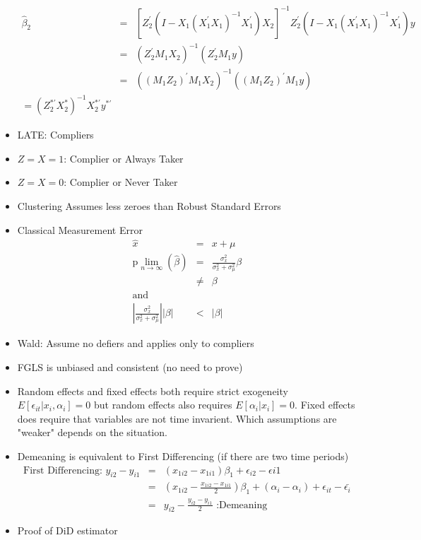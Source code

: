 \documentclass[11pt]{SelfArxOneColBMN}
\begin{document}
\begin{itemize}
\begin{eqnarray*}
    \hat{\beta}_2 &=& [Z_2^\prime(I - X_1(X_1^\prime X_1)^{-1}X_1^\prime)X_2]^{-1}Z^\prime_2(I - X_1(X_1^\prime X_1)^{-1}X_1^\prime)y\\
    &=& (Z_2^\prime M_1X_2)^{-1}(Z_2^\prime M_1y)\\
    &=& ((M_1Z_2)^\prime M_1X_2)^{-1}((M_1Z_2)^\prime M_1y)\\
    = (Z_2^{*\prime}X_2^*)^{-1}X_2^{*\prime}y^{*\prime}
  \end{eqnarray*}
  \item LATE: Compliers
  \item $Z = X = 1$: Complier or Always Taker
  \item $Z = X = 0$: Complier or Never Taker
  \item Clustering Assumes less zeroes than Robust Standard Errors
  \item Classical Measurement Error
  \begin{eqnarray*}
    \hat{x} &=& x + \mu\\
    \text{p}\lim_{n\rightarrow\infty}(\hat{\beta}) &=& \frac{\sigma_x^2}{\sigma_x^2 + \sigma^2_\mu}\beta\\
    &\neq& \beta\\
    \text{and}\\
    |\frac{\sigma_x^2}{\sigma_x^2 + \sigma^2_\mu}||\beta| &<& |\beta|
  \end{eqnarray*}
  \item Wald: Assume no defiers and applies only to compliers
  \item FGLS is unbiased and consistent (no need to prove)
  \item Random effects and fixed effects both require strict exogeneity $E[\epsilon_{it}|x_i,\alpha_i] = 0$ but random effects also requires $E[\alpha_i|x_i] = 0$. Fixed effects does require that variables are not time invarient. Which assumptions are "weaker" depends on the situation.
  \item Demeaning is equivalent to First Differencing (if there are two time periods)
  \begin{eqnarray*}
    \text{First Differencing: }y_{i2} - y_{i1} &=& (x_{1i2} - x_{1i1})\beta_1 + \epsilon_{i2} - \epsilon{i1}\\
    &=& (x_{1i2} - \frac{x_{1i2} - x_{1i1}}{2})\beta_1 + (\alpha_i - \alpha_i) + \epsilon_{it} - \bar{\epsilon_i}\\
    &=& y_{i2} - \frac{y_{i2} - y_{i1}}{2}\text{ :Demeaning}
  \end{eqnarray*}
  \item Proof of DiD estimator

\end{itemize}
\end{document}
